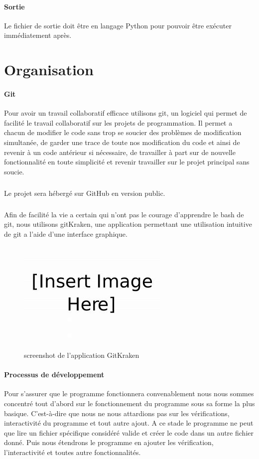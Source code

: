 \documentclass{report}
\begin{document}
		\paragraph{Sortie} Le fichier de sortie doit être en langage Python pour pouvoir être exécuter immédiatement après.
	
	\section{Organisation}
		\paragraph{Git}
			Pour avoir un travail collaboratif efficace utilisons git, un logiciel qui permet de facilité le travail collaboratif sur les projets de programmation. Il permet a chacun de modifier le code sans trop se soucier des problèmes de modification simultanée, de garder une trace de toute nos modification du code et ainsi de revenir à un code antérieur si nécessaire, de travailler à part sur de nouvelle fonctionnalité en toute simplicité et revenir travailler sur le projet principal sans soucie.
			\subparagraph{}	
Le projet sera hébergé sur GitHub en version public.
			\subparagraph{}
Afin de facilité la vie a certain qui n'ont pas le courage d'apprendre le bash de git, nous utilisons gitKraken, une application permettant une utilisation intuitive de git a l'aide d'une interface graphique.
			\begin{figure}[h]
				\begin{center}			
					\includegraphics[scale=0.60]{images/insert_image_here.jpg}
					\caption{screenshot de l'application GitKraken}
				\end{center}
			\end{figure}

		\paragraph{Processus de développement}
			Pour s'assurer que le programme fonctionnera convenablement nous nous sommes concentré tout d'abord sur le fonctionnement du programme sous sa forme la plus basique. C'est-à-dire que nous ne nous attardions pas sur les vérifications, interactivité du programme et tout autre ajout. A ce stade le programme ne peut que lire un fichier spécifique considéré valide et créer le code dans un autre fichier donné. Puis nous étendrons le programme en ajouter les vérification, l'interactivité et toutes autre fonctionnalités.
 
\end{document}
